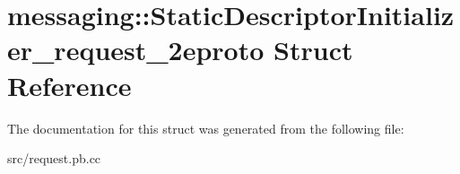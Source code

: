\hypertarget{structmessaging_1_1StaticDescriptorInitializer__request__2eproto}{
\section{messaging::StaticDescriptorInitializer\_\-request\_\-2eproto Struct Reference}
\label{structmessaging_1_1StaticDescriptorInitializer__request__2eproto}
}


The documentation for this struct was generated from the following file:\begin{DoxyCompactItemize}
\item 
src/request.pb.cc\end{DoxyCompactItemize}
